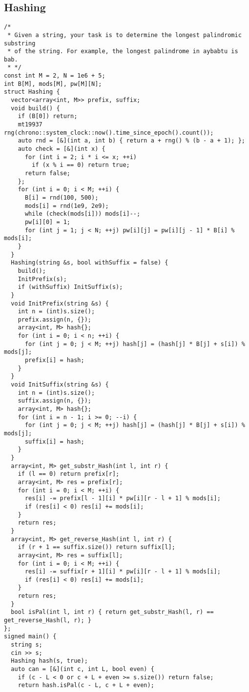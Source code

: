 \documentclass[twoside]{article}
\begin{document}
\begin{multicols*}{2}
{\subsection*{Hashing}
}
\begin{verbatim}
/*
 * Given a string, your task is to determine the longest palindromic substring
 * of the string. For example, the longest palindrome in aybabtu is bab.
 * */
const int M = 2, N = 1e6 + 5;
int B[M], mods[M], pw[M][N];
struct Hashing {
  vector<array<int, M>> prefix, suffix;
  void build() {
    if (B[0]) return;
    mt19937 rng(chrono::system_clock::now().time_since_epoch().count());
    auto rnd = [&](int a, int b) { return a + rng() % (b - a + 1); };
    auto check = [&](int x) {
      for (int i = 2; i * i <= x; ++i)
        if (x % i == 0) return true;
      return false;
    };
    for (int i = 0; i < M; ++i) {
      B[i] = rnd(100, 500);
      mods[i] = rnd(1e9, 2e9);
      while (check(mods[i])) mods[i]--;
      pw[i][0] = 1;
      for (int j = 1; j < N; ++j) pw[i][j] = pw[i][j - 1] * B[i] % mods[i];
    }
  }
  Hashing(string &s, bool withSuffix = false) {
    build();
    InitPrefix(s);
    if (withSuffix) InitSuffix(s);
  }
  void InitPrefix(string &s) {
    int n = (int)s.size();
    prefix.assign(n, {});
    array<int, M> hash{};
    for (int i = 0; i < n; ++i) {
      for (int j = 0; j < M; ++j) hash[j] = (hash[j] * B[j] + s[i]) % mods[j];
      prefix[i] = hash;
    }
  }
  void InitSuffix(string &s) {
    int n = (int)s.size();
    suffix.assign(n, {});
    array<int, M> hash{};
    for (int i = n - 1; i >= 0; --i) {
      for (int j = 0; j < M; ++j) hash[j] = (hash[j] * B[j] + s[i]) % mods[j];
      suffix[i] = hash;
    }
  }
  array<int, M> get_substr_Hash(int l, int r) {
    if (l == 0) return prefix[r];
    array<int, M> res = prefix[r];
    for (int i = 0; i < M; ++i) {
      res[i] -= prefix[l - 1][i] * pw[i][r - l + 1] % mods[i];
      if (res[i] < 0) res[i] += mods[i];
    }
    return res;
  }
  array<int, M> get_reverse_Hash(int l, int r) {
    if (r + 1 == suffix.size()) return suffix[l];
    array<int, M> res = suffix[l];
    for (int i = 0; i < M; ++i) {
      res[i] -= suffix[r + 1][i] * pw[i][r - l + 1] % mods[i];
      if (res[i] < 0) res[i] += mods[i];
    }
    return res;
  }
  bool isPal(int l, int r) { return get_substr_Hash(l, r) == get_reverse_Hash(l, r); }
};
signed main() {
  string s;
  cin >> s;
  Hashing hash(s, true);
  auto can = [&](int c, int L, bool even) {
    if (c - L < 0 or c + L + even >= s.size()) return false;
    return hash.isPal(c - L, c + L + even);

\end{verbatim}
\end{multicols*}
\end{document}
